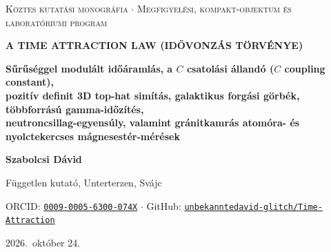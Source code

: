 \documentclass[10pt,a4paper]{article}
\begin{document}
\thispagestyle{titlefoot}
\vspace*{-8mm}
\noindent{\color{navy}\rule{\linewidth}{2pt}}\par\vspace{1.5mm}
\begin{center}
  {\footnotesize\scshape\color{slate}K\"oztes kutat\'asi monogr\'afia $\cdot$ Megfigyel\'esi, kompakt-objektum \'es laborat\'oriumi program}\par\vspace{1.5mm}
  {\LARGE\bfseries\color{navy}A TIME ATTRACTION LAW (ID\H{O}VONZ\'AS T\"ORV\'ENYE)}\par\vspace{2mm}
  {\large\bfseries\color{slate}S\H{u}r\H{u}s\'eggel modul\'alt id\H{o}\'araml\'as, a $C$ csatol\'asi \'alland\'o ($C$ coupling constant),}\\
  {\large\bfseries\color{slate}pozit\'iv definit 3D top-hat sim\'it\'as, galaktikus forg\'asi g\"orb\'ek, t\"obbforr\'as\'u gamma-id\H{o}z\'it\'es,}\\
  {\large\bfseries\color{slate}neutroncsillag-egyens\'uly, valamint gr\'anitkamr\'as atom\'ora- \'es nyolctekercses m\'agnesest\'er-m\'er\'esek}\par\vspace{2mm}
  {\normalsize\bfseries Szabolcsi D\'avid}\par\vspace{1mm}
  {\small F\"uggetlen kutat\'o, Unterterzen, Sv\'ajc}\par
  {\small ORCID: \href{https://orcid.org/0009-0005-6300-074X}{\texttt{0009-0005-6300-074X}} $\cdot$ GitHub: \href{https://github.com/unbekanntedavid-glitch/Time-Attraction}{\texttt{unbekanntedavid-glitch/Time-Attraction}}}\par
  {\small 2026.\ okt\'ober 24.}
\end{center}
\vspace{1.5mm}
\noindent{\color{navy}\rule{\linewidth}{0.8pt}}\par\vspace{2mm}
\end{document}
